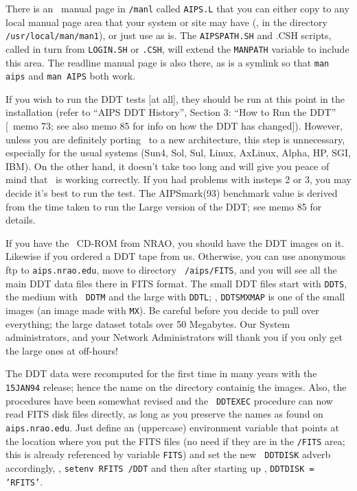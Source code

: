 There is an \AIPS\ manual page in {\tt\SYSU/manl} called {\tt AIPS.L}
that you can either copy to any local manual page area that your system
or site may have (\eg, in the directory {\tt /usr/local/man/man1}), or
just use as is.  The {\tt AIPSPATH.SH} and {.CSH} scripts, called in
turn from {\tt LOGIN.SH} or {\tt .CSH}, will extend the {\tt MANPATH}
variable to include this area.  The readline manual page is also there,
as is a symlink so that {\tt man aips} and {\tt man AIPS} both work.

\medskip{}

If you wish to run the DDT tests [at all], they should be run at this
point in the installation (refer to ``AIPS DDT History'', Section 3:
``How to Run the DDT'' [\aips\ memo 73; see also memo 85 for info on how
the DDT has changed]).  However, unless you are definitely porting
\aips\ to a new architecture, this step is unnecessary, especially for
the usual systems (Sun4, Sol, Sul, Linux, AxLinux, Alpha, HP, SGI, IBM).
On the other hand, it doesn't take too long and will give you peace of
mind that \aips\ is working correctly.  If you had problems with insteps 2
or 3, you may decide it's best to run the test.  The AIPSmark(93)
benchmark value is derived from the time taken to run the Large version of
the DDT; see memo 85 for details.

If you have the \AIPS\ CD-ROM from NRAO, you should have the DDT images
on it.  Likewise if you ordered a DDT tape from us.  Otherwise, you can
use anonymous ftp to {\tt aips.nrao.edu}, move to directory {\tt
/aips/FITS}, and you will see all the main DDT data files there in FITS
format.  The small DDT files start with {\tt DDTS}, the medium with {\tt
DDTM} and the large with {\tt DDTL}; \eg, {\tt DDTSMXMAP} is one of the
small images (an image made with {\tt MX}).  Be careful before you
decide to pull over everything; the large dataset totals over 50
Megabytes.  Our System administrators, and your Network Administrators
will thank you if you only get the large ones at off-hours!

The DDT data were recomputed for the first time in many years with the
{\tt 15JAN94} release; hence the name on the directory containig the
images.  Also, the procedures have been somewhat revised and the {\tt
DDTEXEC} procedure can now read FITS disk files directly, as long as you
preserve the names as found on {\tt aips.nrao.edu}.  Just define an
(uppercase) environment variable that points at the location where you
put the FITS files (no need if they are in the {\tt \AROOT/FITS} area;
this is already referenced by variable {\tt FITS}) and set the new {\tt
DDTDISK} adverb accordingly, \eg, {\tt setenv RFITS \HOME/DDT} and then
after starting up \AIPS, {\tt DDTDISK = 'RFITS'}.

